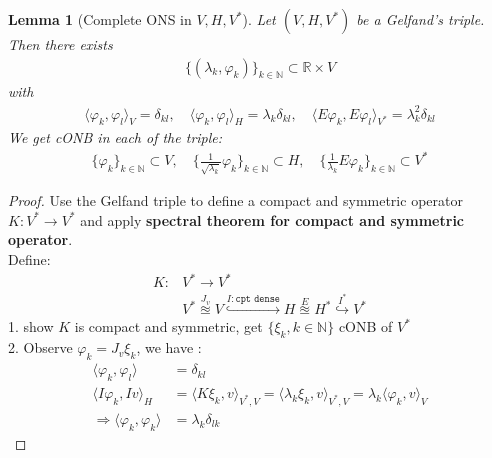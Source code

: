 \documentclass[a4paper,11pt,oneside,fleqn]{book}
\newtheorem{lemma}[theorem]{Lemma}
\theoremstyle{definition}
\theoremstyle{remark}
\begin{document}
 
 \begin{lemma}[Complete ONS in $V, H, V^*$]
 	Let $(V, H, V^*)$ be a Gelfand's triple. Then there exists 
 	\begin{align*}
 		\{(\lambda_k, \varphi_k)\}_{k \in \mathbb{N}} \subset \mathbb{R} \times V
 	\end{align*}
 	with
 	\begin{align*}
 		\langle \varphi_k, \varphi_l \rangle_V = \delta_{kl}, \quad
 		\langle \varphi_k, \varphi_l \rangle_H = \lambda_k \delta_{kl}, \quad
 		\langle E\varphi_k, E\varphi_l\rangle_{V^*} = \lambda_k^2 \delta_{kl}
 	\end{align*}
 	We get cONB in each of the triple:
 	\begin{align*}
 		\{\varphi_k\}_{k \in \mathbb{N}} \subset V, \quad 
 		\{\frac{1}{\sqrt{\lambda_k}} \varphi_k\}_{k \in \mathbb{N}} \subset H, \quad
 		\{\frac{1}{\lambda_k}E\varphi_k\}_{k \in \mathbb{N}} \subset V^*
 	\end{align*} 
 \end{lemma}
 \begin{proof}
 	Use the Gelfand triple to define a compact and symmetric operator $K: V^* \rightarrow V^*$ and apply \textbf{spectral theorem for compact and symmetric operator}. \quad\\
 	Define:
 	\begin{align*}
 		K: &V^* \rightarrow V^*\\
 		&V^* \overset{J_v}{\approxeq}V \overset{I:\texttt{cpt dense}}{ \hookrightarrow} H \overset{E}{\approxeq} H^*  \overset{I^*}{\hookrightarrow} V^* 
 	\end{align*}
 	1. show $K$ is compact and symmetric, get $\{\xi_k, k \in \mathbb{N}\}$ cONB of $V^*$   \\
 	2. Observe $\varphi_k = J_v \xi_k$, we have :
 	\begin{align*}
 		\langle \varphi_k, \varphi_l \rangle &= \delta_{kl}\\
 		\langle I \varphi_k, Iv \rangle_H &= \langle K \xi_k, v \rangle_{V^*, V} = \langle \lambda_k \xi_k, v \rangle_{V^*, V} = \lambda_k \langle \varphi_k, v \rangle_V\\
 		\Rightarrow 
 		\langle \varphi_k, \varphi_k \rangle &= \lambda_k \delta_{lk}
 	\end{align*}
 \end{proof}
 
\end{document}
